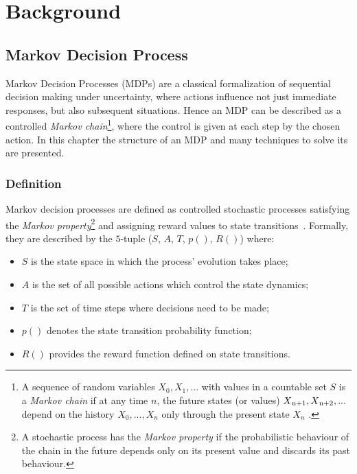 \chapter{Background}

\section{Markov Decision Process}

Markov Decision Processes (MDPs) are a classical formalization of sequential decision making under uncertainty, where actions influence not just immediate responses, but also subsequent situations. Hence an MDP can be described as a controlled \textit{Markov chain}\footnote{A sequence of random variables $X_0, X_1, . . . $ with values in a countable set $S$ is a \textit{Markov chain} if at any time $n$, the future states (or values) $X\textsubscript{n+1}, X\textsubscript{n+2}, . . .$ depend on the history $X_0, . . . , X_n$ only through the present state $X_n$ \cite{konstantopoulos2009markov}.}, where the control is given at each step by the chosen action. In this chapter the structure of an MDP and many techniques to solve its are presented.

\subsection{Definition} Markov decision processes are defined as controlled stochastic processes satisfying the \textit{Markov property}\footnote{A stochastic process has the \textit{Markov property} if the probabilistic behaviour of the chain in the future depends only on its present value and discards its past behaviour.} and assigning reward values to state transitions~\cite{Put94}.  Formally, they are described by the $5$-tuple ($S$, $A$, $T$, $p()$, $R()$) where:

\begin{itemize}
	\item $S$ is the state space in which the process’ evolution takes place;
	\item $A$ is the set of all possible actions which control the state dynamics;
	\item $T$ is the set of time steps where decisions need to be made;
	\item $p()$ denotes the state transition probability function;
	\item $R()$ provides the reward function defined on state transitions.	
\end{itemize}

